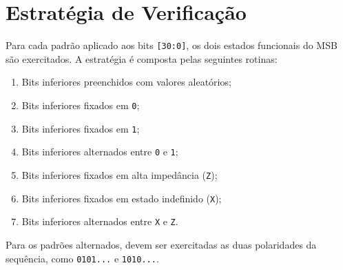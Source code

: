\documentclass[12pt,a4paper]{article}
\begin{document}
\section{Estratégia de Verificação}
Para cada padrão aplicado aos bits \texttt{[30:0]}, os dois estados funcionais do MSB são exercitados. A estratégia é composta pelas seguintes rotinas:

\begin{enumerate}
    \item Bits inferiores preenchidos com valores aleatórios;
    \item Bits inferiores fixados em \texttt{0};
    \item Bits inferiores fixados em \texttt{1};
    \item Bits inferiores alternados entre \texttt{0} e \texttt{1};
    \item Bits inferiores fixados em alta impedância (\texttt{Z});
    \item Bits inferiores fixados em estado indefinido (\texttt{X});
    \item Bits inferiores alternados entre \texttt{X} e \texttt{Z}.
\end{enumerate}

Para os padrões alternados, devem ser exercitadas as duas polaridades da sequência, como \texttt{0101...} e \texttt{1010...}.
\end{document}

